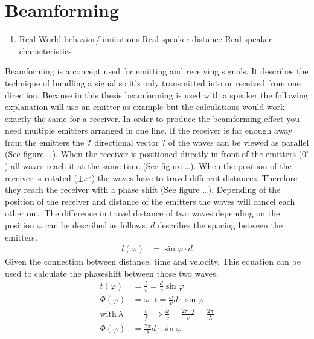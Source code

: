 \section{Beamforming}

\begin{enumerate}
  \item Real-World behavior/limitations
  \subitem Real speaker distance
  \subitem Real speaker characteristics
\end{enumerate}

Beamforming is a concept used for emitting and receiving signals. It describes the technique of bundling a signal so it's only transmitted into or received from one direction. Because in this thesis beamforming is used with a speaker the following explanation will use an emitter as example but the calculations would work exactly the same for a receiver.\p
%
In order to produce the beamforming effect you need multiple emitters arranged in one line.
If the receiver is far enough away from the emitters the \textbf{?} directional vector ? of the waves can be viewed as parallel (See figure \dots). When the receiver is positioned directly in front of the emitters (\(0^\circ\)) all waves reach it at the same time (See figure \dots).
When the position of the receiver is rotated (\(\pm x^\circ\)) the waves have to travel different distances. Therefore they reach the receiver with a phase shift (See figure \dots). Depending of the position of the receiver and distance of the emitters the waves will cancel each other out.\p
%
The difference in travel distance of two waves depending on the position \(\varphi\) can be described as follows. \(d\) describes the spacing between the emitters.
%
\begin{align}
  l(\varphi) &= \sin \varphi \cdot d
\end{align}
%
Given the connection between distance, time and velocity. This equation can be used to calculate the phaseshift between those two waves.
%
\begin{align}
  t(\varphi)     &= \frac{l}{v} = \frac{d}{v} \sin \varphi \\[1em]
  \Phi(\varphi)  &= \omega \cdot t = \frac{\omega}{v} d \cdot \sin \varphi \\[1em]
  \mathrm{with~} \lambda &= \frac{v}{f} \implies \frac{\omega}{v} = \frac{2\pi \cdot f}{v} = \frac{2\pi}{\lambda} \\[1em]
  \Phi(\varphi)  &= \frac{2\pi}{\lambda} d \cdot \sin \varphi
\end{align}
